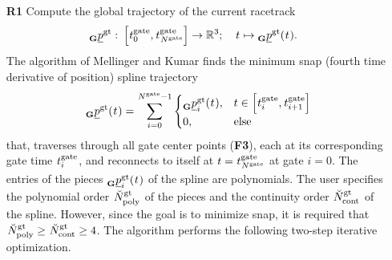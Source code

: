 \begin{itemize}
    \item [\textbf{R1}] Compute the global trajectory of the current racetrack
    \begin{align} \label{eq:glo_traj}
        \pos[]{\glotraj}{}{\grs}{}
        :\ 
        &\left[
            \timepnt[]{\gate}{0}{}{}, 
            \timepnt[]{\gate}{\num[]{\gate}{}{}{}}{}{}
        \right] \rightarrow \mathbb{R}^3
        ;\quad
        \timepnt[]{}{}{}{}
        \mapsto
        \pos[]{\glotraj}{}{\grs}{}(\timepnt[]{}{}{}{})
        .
    \end{align}
    The algorithm of Mellinger and Kumar \cite{Mellinger2011}
    finds the minimum snap (fourth time derivative of position) spline trajectory
    \begin{align}
        \pos[]{\glotraj}{}{\grs}{}(\timepnt[]{}{}{}{})
        = \sum_{i = 0}^{\num[]{\gate}{}{}{} - 1}
        \begin{cases}
            \pos[]{\glotraj}{i}{\grs}{}(\timepnt[]{}{}{}{})
            , 
            &t \in \left[\timepnt[]{\gate}{i}{}{}, \timepnt[]{\gate}{i+1}{}{}\right] \\
            0, & \text{else}
        \end{cases}
    \end{align}
    that, traverses through all gate center points (\textbf{F3}),
    each at its corresponding gate time $\timepnt[]{\gate}{i}{}{}$,
    and reconnects to itself at $t=\timepnt[]{\gate}{\num[]{\gate}{}{}{}}{}{}$ at gate $i=0$.
    The entries of the pieces 
    $\pos[]{\glotraj}{i}{\grs}{}(\timepnt[]{}{}{}{})$
    of the spline are polynomials. 
    The user specifies the polynomial order 
    $\num[\user]{\glotraj}{\text{poly}}{}{}$
    of the pieces and
    the continuity order
    $\num[\user]{\glotraj}{\text{cont}}{}{}$
    of the spline. 
    However, since the goal is to minimize snap,
    it is required that 
    $
    \num[\user]{\glotraj}{\text{poly}}{}{}
    \ge \num[\user]{\glotraj}{\text{cont}}{}{} \ge 4
    $.
    The algorithm performs the following two-step iterative optimization.


\end{itemize}
